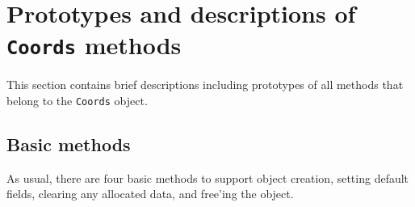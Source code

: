 \par
\section{Prototypes and descriptions of {\tt Coords} methods}
\label{section:Coords:proto}
\par
This section contains brief descriptions including prototypes
of all methods that belong to the {\tt Coords} object.
\par
\subsection{Basic methods}
\label{subsection:Coords:proto:basics}
\par
As usual, there are four basic methods to support object creation,
setting default fields, clearing any allocated data, and free'ing
the object.
\par
